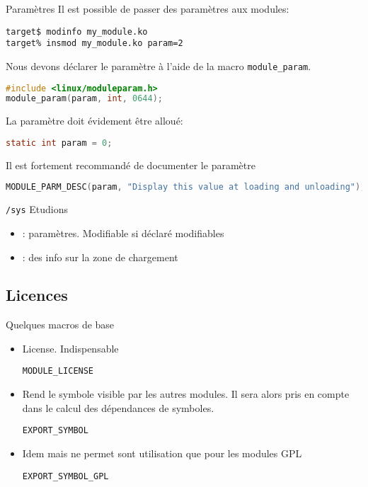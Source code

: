 \begin{frame}[fragile=singleslide]{Paramètres}
  Il est possible de passer des paramètres aux modules:
  \begin{lstlisting}
target$ modinfo my_module.ko 
target% insmod my_module.ko param=2  
  \end{lstlisting} %
  Nous devons déclarer le paramètre à l'aide de la macro \texttt{module\_param}. 
  \begin{lstlisting}[language=c]
#include <linux/moduleparam.h>
module_param(param, int, 0644);
  \end{lstlisting} 
  La paramètre doit évidement être alloué:
  \begin{lstlisting}[language=c]
static int param = 0;
  \end{lstlisting} 
  Il est fortement recommandé de documenter le paramètre
  \begin{lstlisting}[language=c]
MODULE_PARM_DESC(param, "Display this value at loading and unloading");
  \end{lstlisting} 
\end{frame}

\begin{frame}[fragile=singleslide]{\texttt{/sys}}
  Etudions 
  \begin{itemize}
  \item                       {}:
    paramètres. Modifiable si déclaré modifiables
  \item {}:  des info sur  la zone
    de chargement
  \end{itemize}
\end{frame}

\subsection{Licences}

\begin{frame}[fragile=singleslide]{Quelques macros de base}
  \begin{itemize} 
  \item License. Indispensable
    \begin{lstlisting}
MODULE_LICENSE
    \end{lstlisting}
  \item Rend le symbole visible par les autres modules.  Il sera alors
    pris en compte dans le calcul des dépendances de symboles.
    \begin{lstlisting}
EXPORT_SYMBOL
    \end{lstlisting} 
  \item Idem  mais  ne permet sont utilisation que
    pour les modules GPL
    \begin{lstlisting}
EXPORT_SYMBOL_GPL
    \end{lstlisting} 
  \end{itemize}
\end{frame}

